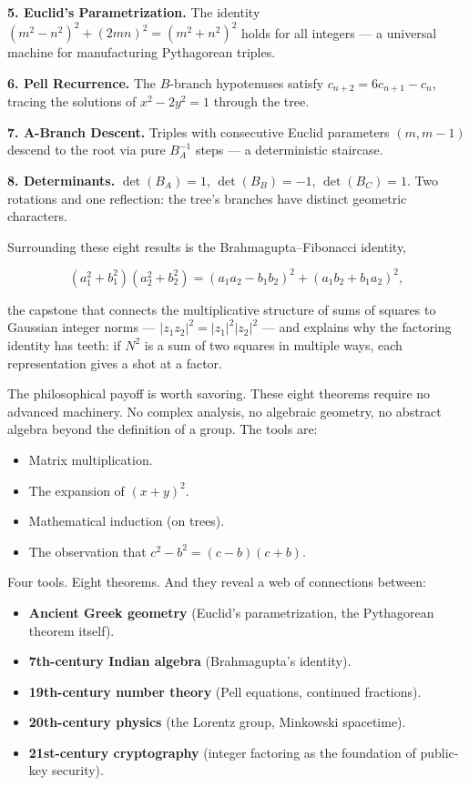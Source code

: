 \documentclass[11pt,twoside,openright]{book}
\theoremstyle{definition}
\theoremstyle{remark}
\begin{document}
\textbf{5. Euclid's Parametrization.} The identity $(m^2 - n^2)^2 + (2mn)^2 = (m^2 + n^2)^2$ holds for all integers --- a universal machine for manufacturing Pythagorean triples.

\textbf{6. Pell Recurrence.} The $B$-branch hypotenuses satisfy $c_{n+2} = 6c_{n+1} - c_n$, tracing the solutions of $x^2 - 2y^2 = 1$ through the tree.

\textbf{7. A-Branch Descent.} Triples with consecutive Euclid parameters $(m, m-1)$ descend to the root via pure $B_A^{-1}$ steps --- a deterministic staircase.

\textbf{8. Determinants.} $\det(B_A) = 1$, $\det(B_B) = -1$, $\det(B_C) = 1$. Two rotations and one reflection: the tree's branches have distinct geometric characters.

Surrounding these eight results is the Brahmagupta--Fibonacci identity,

\[(a_1^2 + b_1^2)(a_2^2 + b_2^2) = (a_1 a_2 - b_1 b_2)^2 + (a_1 b_2 + b_1 a_2)^2,\]

the capstone that connects the multiplicative structure of sums of squares to Gaussian integer norms --- $|z_1 z_2|^2 = |z_1|^2 |z_2|^2$ --- and explains why the factoring identity has teeth: if $N^2$ is a sum of two squares in multiple ways, each representation gives a shot at a factor.

The philosophical payoff is worth savoring. These eight theorems require no advanced machinery. No complex analysis, no algebraic geometry, no abstract algebra beyond the definition of a group. The tools are:

\begin{itemize}
  \item Matrix multiplication.
  \item The expansion of $(x + y)^2$.
  \item Mathematical induction (on trees).
  \item The observation that $c^2 - b^2 = (c - b)(c + b)$.
\end{itemize}

Four tools. Eight theorems. And they reveal a web of connections between:

\begin{itemize}
  \item \textbf{Ancient Greek geometry} (Euclid's parametrization, the Pythagorean theorem itself).
  \item \textbf{7th-century Indian algebra} (Brahmagupta's identity).
  \item \textbf{19th-century number theory} (Pell equations, continued fractions).
  \item \textbf{20th-century physics} (the Lorentz group, Minkowski spacetime).
  \item \textbf{21st-century cryptography} (integer factoring as the foundation of public-key security).
\end{itemize}
\end{document}
